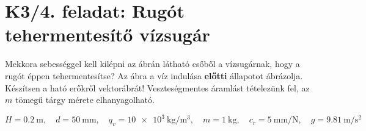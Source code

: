\section*{K3/4. feladat: Rugót tehermentesítő vízsugár} 

Mekkora sebességgel kell kilépni az ábrán látható csőből a vízsugárnak, hogy a rugót éppen tehermentesítse?
Az ábra a víz indulása \textbf{előtti} állapotot ábrázolja.
Készítsen a ható erőkről vektorábrát! 
Veszteségmentes áramlást tételezünk fel, az $m$ tömegű tárgy mérete elhanyagolható.

\begin{equation*}
	H = \SI{0,2}{\meter},
	\quad
	d = \SI{50}{\milli\meter}, 
	\quad
	q_v = \SI{10e3}{\kilogram\per\meter\cubed},
	\quad
	m = \SI{1}{\kilogram},
	\quad
	c_r = \SI{5}{\milli\meter\per\newton},
	\quad
	g = \SI{9,81}{\meter\per\second\squared}
	\end{equation*}

